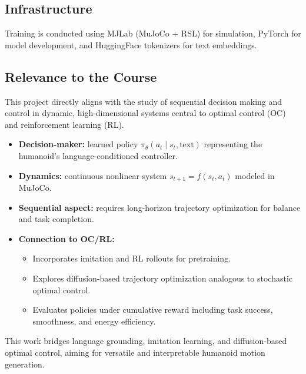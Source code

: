 \subsection{Infrastructure}
Training is conducted using MJLab (MuJoCo + RSL) for simulation, PyTorch for model development, and HuggingFace tokenizers for text embeddings.

\subsection{Relevance to the Course}

This project directly aligns with the study of sequential decision making and control in dynamic, high-dimensional systems central to optimal control (OC) and reinforcement learning (RL).

\begin{itemize}
    \item \textbf{Decision-maker:} learned policy $\pi_\theta(a_t \mid s_t, \text{text})$ representing the humanoid’s language-conditioned controller.
    \item \textbf{Dynamics:} continuous nonlinear system $s_{t+1} = f(s_t, a_t)$ modeled in MuJoCo.
    \item \textbf{Sequential aspect:} requires long-horizon trajectory optimization for balance and task completion.
    \item \textbf{Connection to OC/RL:}
    \begin{itemize}
        \item Incorporates imitation and RL rollouts for pretraining.
        \item Explores diffusion-based trajectory optimization analogous to stochastic optimal control.
        \item Evaluates policies under cumulative reward including task success, smoothness, and energy efficiency.
    \end{itemize}
\end{itemize}

This work bridges language grounding, imitation learning, and diffusion-based optimal control, aiming for versatile and interpretable humanoid motion generation.